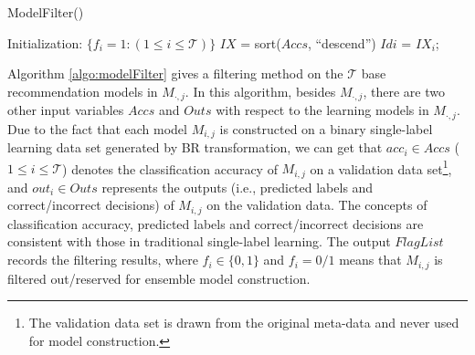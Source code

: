 \documentclass[prodmode,acmtkdd]{acmsmall}
\begin{document}
\IncMargin{0.35em} \LinesNumbered
\begin{algorithm}[!ht]
  \scriptsize
  \SetAlgoVlined
  \caption{ModelFilter()}\label{algo:modelFilter}
 \BlankLine
 \BlankLine
 Initialization: $\{f_i = 1: (1\leq i\leq \mathcal{T})\}$\;
  {
 }
 $IX$ = sort($Accs$, ``descend'')
  {
    $Idi$ = $IX_i$;
 }
\end{algorithm}
\DecMargin{0.35em} \LinesNumbered

Algorithm \ref{algo:modelFilter} gives a filtering method on the $\mathcal{T}$
base recommendation models in $M_{\cdot,j}$. In this algorithm,
besides $M_{\cdot,j}$, there are two other input variables $Accs$
and $Outs$ with respect to the learning models in $M_{\cdot,j}$. Due
to the fact that each model $M_{i,j}$ is constructed on a binary
single-label learning data set generated by BR transformation, we
can get that $acc_i \in Accs$ ($1\leq i \leq \mathcal{T}$) denotes the
classification accuracy of $M_{i,j}$ on a validation data
set\footnote{The validation data set is drawn from the original
meta-data and never used for model construction.}, and $out_i \in
Outs$ represents the outputs (i.e., predicted labels and
correct/incorrect decisions) of $M_{i,j}$ on the validation data.
The concepts of classification accuracy, predicted labels and
correct/incorrect decisions are consistent with those in traditional
single-label learning. The output $FlagList$ records the filtering
results, where $f_i \in \{0,1\}$ and $f_i = 0/1$ means that
$M_{i,j}$ is filtered out/reserved for ensemble model construction.
\end{document}
